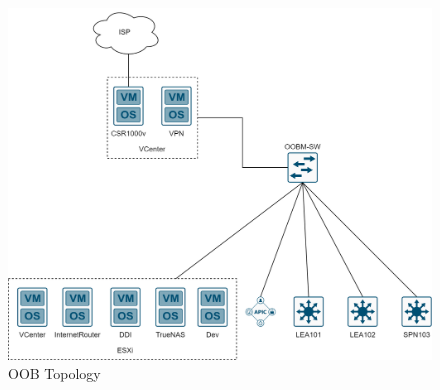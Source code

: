 \begin{figure}[H]
    \centering
    \includegraphics[scale=0.25]{images/oob-topology.png}
    \caption{OOB Topology}
    \label{fig:oob-topology}
\end{figure}

\subsec
